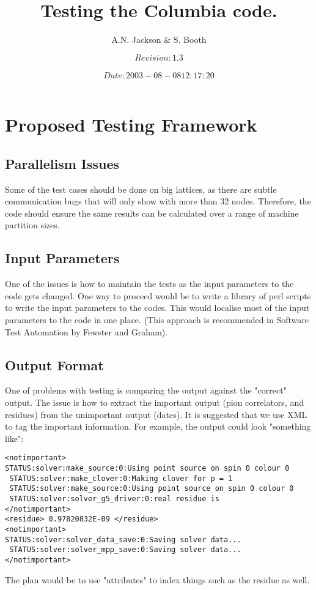 \documentclass[12pt]{article}
\title{Testing the Columbia code.}
\author{A.N. Jackson \& S. Booth}
\date{\mbox{\small $$Revision: 1.3 $$  $$Date: 2003-08-08 12:17:20 $$}}
\begin{document}
\maketitle

\tableofcontents
\newpage

\section{Proposed Testing Framework}

\subsection{Parallelism Issues}
Some of the test cases should be done on big lattices, as there are subtle communication bugs that will only show with more than 32 nodes.  Therefore, the code should ensure the same results can be calculated over a range of machine partition sizes.

\subsection{Input Parameters}
One of the issues is how to maintain the tests 
as the input parameters to the code gets changed. One way to
proceed would be to write a library of perl scripts to write 
the input parameters to the codes. This would localise most of the 
input parameters to the code in one place. (This approach is 
recommended in Software Test Automation by Fewster and 
Graham).


\subsection{Output Format}
One of problems with testing is comparing the output against the "correct" output. The issue is how to extract the important output (pion correlators, and residues) from the unimportant output (dates).  It is suggested that we use XML to tag the important information. 
For example, the output could look "something like":
\begin{verbatim}
<notimportant>
STATUS:solver:make_source:0:Using point source on spin 0 colour 0
 STATUS:solver:make_clover:0:Making clover for p = 1
 STATUS:solver:make_source:0:Using point source on spin 0 colour 0
 STATUS:solver:solver_g5_driver:0:real residue is  
</notimportant>
<residue> 0.97820832E-09 </residue>
<notimportant>
STATUS:solver:solver_data_save:0:Saving solver data...
 STATUS:solver:solver_mpp_save:0:Saving solver data...
</notimportant>
\end{verbatim}
The plan would be to use "attributes" to index
things such as the residue as well.
\end{document}
